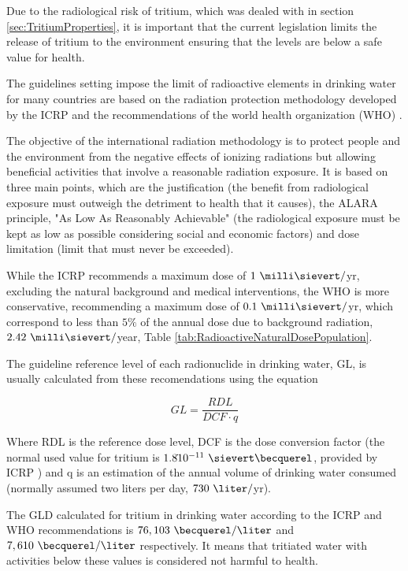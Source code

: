 Due to the radiological risk of tritium, which was dealed with in section \ref{sec:TritiumProperties}, it is important that the current legislation limits the release of tritium to the environment ensuring that the levels are below a safe value for health.

The guidelines setting impose the limit of radioactive elements in drinking water for many countries are based on the radiation protection methodology developed by the ICRP \cite{ICRP_GL} and the recommendations of the world health organization (WHO) \cite{WHO_GL}.


The objective of the international radiation methodology is to  protect people and the environment from the negative effects of ionizing radiations but allowing beneficial activities that involve a reasonable radiation exposure. It is based on three main points, which are the justification (the benefit from radiological exposure must outweigh the detriment to health that it causes), the ALARA principle, "As Low As Reasonably Achievable" (the radiological exposure must be kept as low as possible considering social and economic factors) and dose limitation (limit that must never be exceeded).

While the ICRP recommends a maximum dose of $1~\milli\sievert/$yr, excluding the natural background and medical interventions, the WHO is more conservative, recommending a maximum dose of $0.1~\milli\sievert/$yr, which correspond to less than $5\%$ of the annual dose due to background radiation, $2.42~\milli\sievert/$year, Table \ref{tab:RadioactiveNaturalDosePopulation}.

The guideline reference level of each radionuclide in drinking water, GL, is usually calculated from these recomendations using the equation

\begin{equation}
GL = \frac{RDL}{DCF \cdot{} q}
\label{eq:Guideline}
\end{equation}

Where RDL is the reference dose level, DCF is the dose conversion factor (the normal used value for tritium is $1.8 \dot{} 10^{-11}~\sievert\becquerel$, provided by ICRP \cite{ICRP_factor}) and q is an estimation of the annual volume of drinking water consumed (normally assumed two liters per day, $730~\liter/$yr).

The GLD calculated for tritium in drinking water according to the ICRP and WHO recommendations is $76,103~\becquerel/\liter$ and $7,610~\becquerel/\liter$  respectively. It means that tritiated water with activities below these values is considered not harmful to health.

